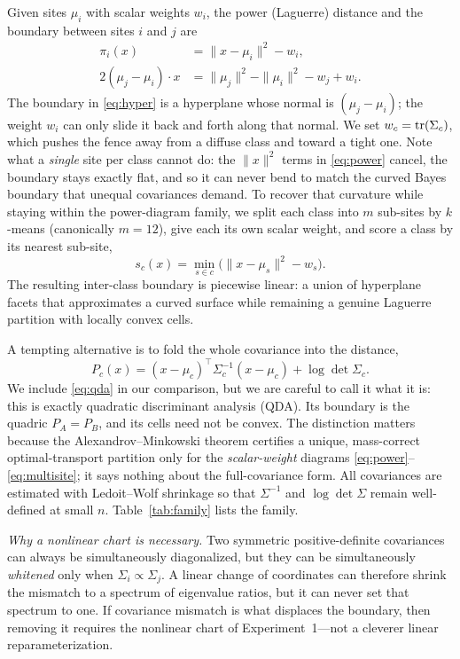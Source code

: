Given sites $\mu_i$ with scalar weights $w_i$, the power (Laguerre) distance and the boundary
between sites $i$ and $j$ are
\begin{align}
  \pi_i(x) &= \|x - \mu_i\|^2 - w_i , \label{eq:power}\\
  2(\mu_j - \mu_i)\!\cdot\! x &= \|\mu_j\|^2 - \|\mu_i\|^2 - w_j + w_i . \label{eq:hyper}
\end{align}
The boundary in \eqref{eq:hyper} is a hyperplane whose normal is $(\mu_j - \mu_i)$; the weight
$w_i$ can only slide it back and forth along that normal. We set $w_c = \operatorname{tr}(\Sigma_c)$, which
pushes the fence away from a diffuse class and toward a tight one. Note what a \emph{single}
site per class cannot do: the $\|x\|^2$ terms in \eqref{eq:power} cancel, the boundary stays
exactly flat, and so it can never bend to match the curved Bayes boundary that unequal
covariances demand. To recover that curvature while staying within the power-diagram family, we
split each class into $m$ sub-sites by $k$-means (canonically $m = 12$), give each its own
scalar weight, and score a class by its nearest sub-site,
\begin{equation}
  s_c(x) = \min_{s \in c}\big( \|x - \mu_s\|^2 - w_s \big).
  \label{eq:multisite}
\end{equation}
The resulting inter-class boundary is piecewise linear: a union of hyperplane facets that
approximates a curved surface while remaining a genuine Laguerre partition with locally convex
cells.

A tempting alternative is to fold the whole covariance into the distance,
\begin{equation}
  P_c(x) = (x - \mu_c)^{\!\top} \Sigma_c^{-1} (x - \mu_c) + \log\det \Sigma_c .
  \label{eq:qda}
\end{equation}
We include \eqref{eq:qda} in our comparison, but we are careful to call it what it is: this is
exactly quadratic discriminant analysis (QDA). Its boundary is the quadric $P_A = P_B$, and its
cells need not be convex. The distinction matters because the Alexandrov--Minkowski theorem
certifies a unique, mass-correct optimal-transport partition only for the \emph{scalar-weight}
diagrams \eqref{eq:power}--\eqref{eq:multisite}; it says nothing about the full-covariance form.
All covariances are estimated with Ledoit--Wolf shrinkage so that $\Sigma^{-1}$ and $\log\det
\Sigma$ remain well-defined at small $n$. Table~\ref{tab:family} lists the family.

\emph{Why a nonlinear chart is necessary.} Two symmetric positive-definite covariances can
always be simultaneously diagonalized, but they can be simultaneously \emph{whitened} only when
$\Sigma_i \propto \Sigma_j$. A linear change of coordinates can therefore shrink the mismatch to
a spectrum of eigenvalue ratios, but it can never set that spectrum to one. If covariance
mismatch is what displaces the boundary, then removing it requires the nonlinear chart of
Experiment~1---not a cleverer linear reparameterization.


